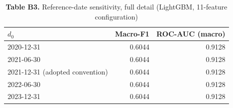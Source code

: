 \documentclass[11pt,a4paper]{article}
\begin{document}
\begin{table}[H]
\centering
\caption*{\small\textbf{Table B3.} Reference-date sensitivity, full detail (LightGBM, 11-feature configuration)}
\begin{tabular}{lrr}
\toprule
$d_0$ & Macro-F1 & ROC-AUC (macro) \\
\midrule
2020-12-31 & 0.6044 & 0.9128 \\
2021-06-30 & 0.6044 & 0.9128 \\
2021-12-31 (adopted convention) & 0.6044 & 0.9128 \\
2022-06-30 & 0.6044 & 0.9128 \\
2023-12-31 & 0.6044 & 0.9128 \\
\bottomrule
\end{tabular}
\end{table}
\end{document}
